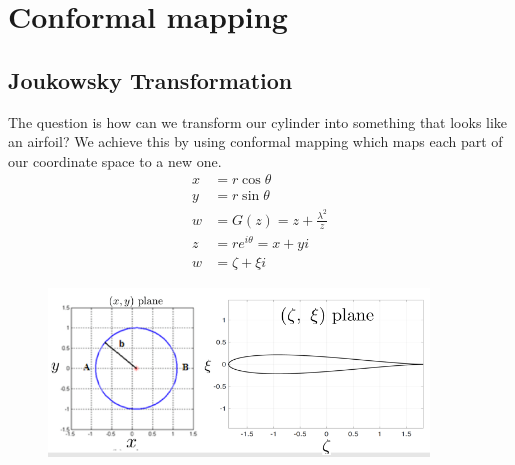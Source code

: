 \documentclass[class=report, crop=false, 12pt,a4paper]{standalone}
\begin{document}
\section{Conformal mapping}
\subsection{Joukowsky Transformation}
The question is how can we transform our cylinder into something that looks like an airfoil? We achieve this by using conformal mapping which maps each part of our coordinate space to a new one. 
\begin{align}
  x &= r\cos{\theta}\\
  y &= r\sin{\theta}\\
  w &= G(z) = z + \frac{\lambda^2}{z}\\
  z &= re^{i\theta} = x + yi\\
  w &= \zeta + \xi i
\end{align}
\begin{figure}[H]
  \centering
  \includegraphics[width = 0.9\textwidth]{../img/diagram32.png}
\end{figure}
\end{document}
